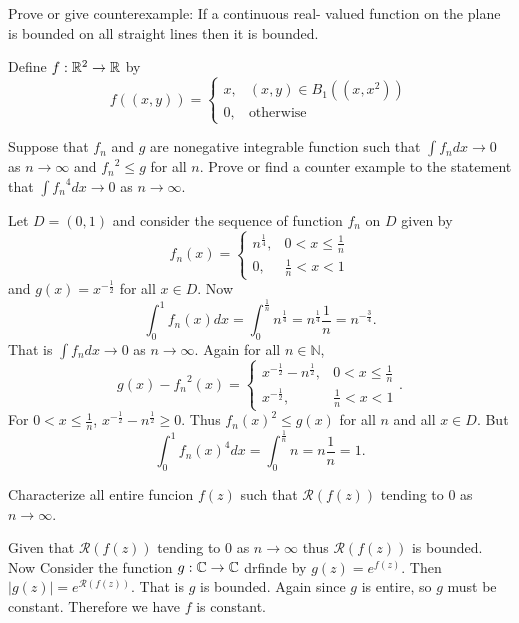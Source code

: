 \question[2B, Fall14] Prove or give counterexample: If a continuous real- valued function on the plane is bounded on all straight lines then it is bounded.
\begin{solution}
    Define $f:\mathbb{R}^2\to\mathbb{R}$ by
    $$f((x,y))=\begin{cases}
        x, & (x,y)\in B_1((x,x^2))\\
        0, & \text{otherwise}
    \end{cases}$$
\end{solution}

\question[3A, Sp16] Suppose that $f_n$ and $g$ are nonegative integrable function such that $\int{f_ndx}\to 0$ as $n\to\infty$ and ${f_n}^2\leq g$ for all $n$. Prove or find a counter example to the statement that $\int{{f_n}^4dx}\to 0$ as $n\to\infty$.
\begin{solution}
    Let $D=(0,1)$ and consider the sequence of function $f_n$ on $D$ given by
    $$f_n(x)=\begin{cases}
        n^{\frac{1}{4}}, & 0<x\leq\frac{1}{n}\\
        0, & \frac{1}{n}<x<1
    \end{cases}$$
    and $g(x)=x^{-\frac{1}{2}}$ for all $x\in D$. Now
    $$\int_{0}^{1}{f_n(x)dx}=\int_{0}^{\frac{1}{n}}{n^{\frac{1}{4}}}=n^{\frac{1}{4}}\frac{1}{n}=n^{-\frac{3}{4}}.$$
    That is $\int{f_ndx}\to 0$ as $n\to\infty$. Again for all $n\in\mathbb{N}$,
    $$g(x)-{f_n}^2(x)=\begin{cases}
        x^{-\frac{1}{2}}-n^{\frac{1}{2}}, & 0<x\leq\frac{1}{n}\\
        x^{-\frac{1}{2}}, & \frac{1}{n}<x<1
    \end{cases}.$$
    For $0<x\leq\frac{1}{n}$, $x^{-\frac{1}{2}}-n^{\frac{1}{2}}\geq 0$. Thus ${f_n}(x)^2\leq g(x)$ for all $n$ and all $x\in D$. But
    $$\int_{0}^{1}{{f_n(x)}^4dx}=\int_{0}^{\frac{1}{n}}{n}=n\frac{1}{n}=1.$$
\end{solution}

\question Characterize all entire funcion $f(z)$ such that $\mathcal{R}({f(z)})$ tending to 0 as $n\to\infty$.
\begin{solution}
    Given that $\mathcal{R}({f(z)})$ tending to 0 as $n\to\infty$ thus $\mathcal{R}({f(z)})$ is bounded. Now Consider the function $g:\mathbb{C}\to\mathbb{C}$ drfinde by $g(z)=e^{f(z)}$. Then $|g(z)|=e^{\mathcal{R}({f(z)})}$. That is $g$ is bounded. Again since $g$ is entire, so $g$ must be constant. Therefore we have $f$ is constant.  
\end{solution}

